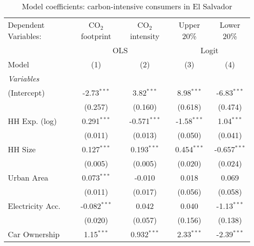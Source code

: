 
\begin{table}[htbp!]
   \centering
   \small
   \begin{adjustbox}{width = 1\textwidth, max height = 0.95\textheight, center}
      \begin{threeparttable}[b]
         \caption{\label{tab:Logit_1_SLV} Model coefficients: carbon-intensive consumers in El Salvador}
         \begin{tabular}{lcccc}
            \tabularnewline \midrule \midrule
            Dependent Variables: & CO$_{2}$ footprint & CO$_{2}$ intensity & Upper 20\%    & Lower 20\%\\   
             & \multicolumn{2}{c}{OLS} & \multicolumn{2}{c}{Logit} \\ 
            Model                & (1)                & (2)                & (3)           & (4)\\  
            \midrule
            \emph{Variables}\\
            (Intercept)          & -2.73$^{***}$      & 3.82$^{***}$       & 8.98$^{***}$  & -6.83$^{***}$\\   
                                 & (0.257)            & (0.160)            & (0.618)       & (0.474)\\   
            HH Exp. (log)        & 0.291$^{***}$      & -0.571$^{***}$     & -1.58$^{***}$ & 1.04$^{***}$\\   
                                 & (0.011)            & (0.013)            & (0.050)       & (0.041)\\   
            HH Size              & 0.127$^{***}$      & 0.193$^{***}$      & 0.454$^{***}$ & -0.657$^{***}$\\   
                                 & (0.005)            & (0.005)            & (0.020)       & (0.024)\\   
            Urban Area           & 0.073$^{***}$      & -0.010             & 0.018         & 0.069\\   
                                 & (0.011)            & (0.017)            & (0.056)       & (0.058)\\   
            Electricity Acc.     & -0.082$^{***}$     & 0.042              & 0.040         & -1.13$^{***}$\\   
                                 & (0.020)            & (0.057)            & (0.156)       & (0.138)\\   
            Car Ownership        & 1.15$^{***}$       & 0.932$^{***}$      & 2.33$^{***}$  & -2.39$^{***}$\\   

\end{tabular}
\end{threeparttable}
\end{adjustbox}
\end{table}
